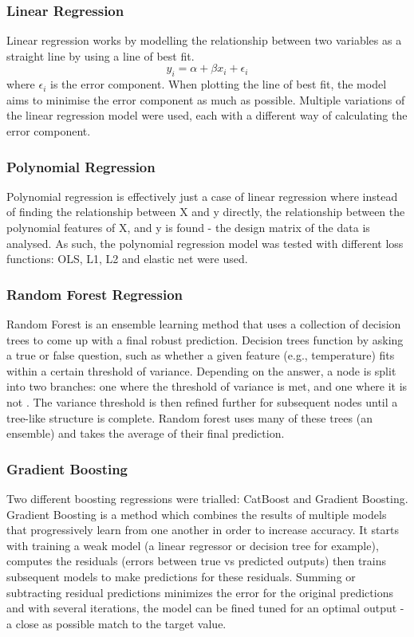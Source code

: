 \documentclass[11pt, titlepage]{article}
\begin{document}
\subsubsection{Linear Regression}
Linear regression works by modelling the relationship between two variables as a straight line by using a line of best fit.
$$y_{i} = \alpha + \beta x_{i} + \epsilon_{i}$$
where $\epsilon_{i}$ is the error component. When plotting the line of best fit, the model aims to minimise the error component as much as possible. Multiple variations of the linear regression model were used, each with a different way of calculating the error component.

\subsubsection{Polynomial Regression}
Polynomial regression is effectively just a case of linear regression\cite{poly} where instead of finding the relationship between X and y directly, the relationship between the polynomial features of X, and y is found - the design matrix of the data is analysed. As such, the polynomial regression model was tested with different loss functions: OLS, L1, L2 and elastic net were used.

\subsubsection{Random Forest Regression}
Random Forest is an ensemble learning method that uses a collection of decision trees to come up with a final robust prediction. Decision trees function by asking a true or false question, such as whether a given feature (e.g., temperature) fits within a certain threshold of variance. Depending on the answer, a node is split into two branches: one where the threshold of variance is met, and one where it is not \cite{randomforest}. The variance threshold is then refined further for subsequent nodes until a tree-like structure is complete. Random forest uses many of these trees (an ensemble) and takes the average of their final prediction.

\subsubsection{Gradient Boosting}
Two different boosting regressions were trialled: CatBoost and Gradient Boosting. Gradient Boosting is a method which combines the results of multiple models that progressively learn from one another in order to increase accuracy\cite{gradboost}. It starts with training a weak model (a linear regressor or decision tree for example), computes the residuals (errors between true vs predicted outputs) then trains subsequent models to make predictions for these residuals. Summing or subtracting residual predictions minimizes the error for the original predictions and with several iterations, the model can be fined tuned for an optimal output - a close as possible match to the target value. \\
\end{document}
